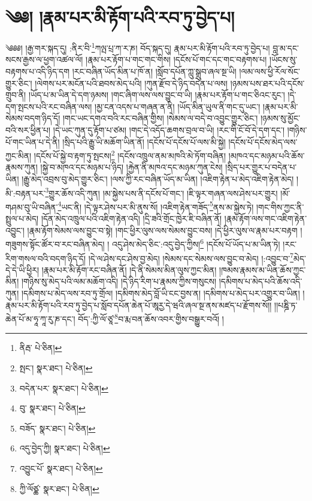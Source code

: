 \setcounter{footnote}{0} 
\chapter{༄༅། །རྣམ་པར་མི་རྟོག་པའི་རབ་ཏུ་བྱེད་པ།}༄༅༅། །རྒྱ་གར་སྐད་དུ། :ནིར་བི་\footnote{ནིརྦ་  པེ་ཅིན། }ཀལྤ་པྲ་ཀ་ར་ཎ། བོད་སྐད་དུ། རྣམ་པར་མི་རྟོག་པའི་རབ་ཏུ་བྱེད་པ། བླ་མ་དང་སངས་རྒྱས་ལ་ཕྱག་འཚལ་ལོ། །རྣམ་པར་རྟོག་པ་གང་གང་གིས། །དངོས་པོ་གང་དང་གང་བརྟགས་པ། །ཡོངས་སུ་བརྟགས་པ་འདི་ཉིད་དག །རང་བཞིན་ཡོད་མིན་པ་ཁོ་ན། །སློབ་དཔོན་ཀླུ་སྒྲུབ་ཞལ་སྔ་ཡི། །ལམ་ལས་ཕྱི་རོལ་སོང་གྱུར་ཅིང་། །ལེགས་པར་མངོན་པའི་ཐབས་མེད་པའི། །ཀུན་རྫོབ་དེ་ཉིད་བདེན་པ་ལས། །ཉམས་པས་ཐར་པའི་དངོས་གྲུབ་ནི། །ཡོད་པ་མ་ཡིན་དེ་དག་ཉམས། །གང་ཞིག་ལས་ལས་བྱུང་བ་ཡི། །རྣམ་པར་རྟོག་པ་གང་ཅིའང་རུང་། །དེ་དག་སྤངས་པའི་རང་བཞིན་ལས། །མྱ་ངན་འདས་པ་གཞན་ན་ནི། །ཡོད་མིན་ཡུལ་ནི་གང་དུ་ཡང་། །རྣམ་པར་མི་སེམས་བདག་ཉིད་དོ། །གང་ཡང་དགའ་བའི་རང་བཞིན་གྱིས། །སེམས་ལ་བདེ་བ་འབྱུང་གྱུར་ཅིང་། །ཉམས་སུ་མྱོང་བའི་སར་ཕྱིན་པ། །དེ་ཡང་ཀུན་དུ་རྟོག་པ་ཙམ། །གང་དེ་འདོད་ཆགས་བྲལ་བ་ཡི། །རང་གི་ངོ་བོ་དེ་དག་དང་། །གཉིས་པོ་གང་ཡིན་པ་དེ་ནི། །སྲིད་པའི་རྒྱུ་ཡི་མཆོག་ཡིན་ནོ། །དངོས་པོ་དངོས་པོ་ལས་མི་སྐྱེ། །དངོས་པོ་དངོས་མེད་ལས་ཀྱང་མིན། །དངོས་པོ་སྐྱེ་བ་རྟག་ཏུ་སྤངས།\footnote{སྤང་།  སྣར་ཐང་།  པེ་ཅིན། } །དངོས་འཁྲུལ་ནམ་མཁའི་མེ་ཏོག་བཞིན། །མཁའ་དང་མཉམ་པའི་ཆོས་རྣམས་ཀུན། །སྐྱེ་བ་མཁའ་དང་མཉམ་པ་ཉིད། །རྐྱེན་ནི་མཁའ་དང་མཉམ་ཀུན་ངེས། །སྲིད་པར་གྱུར་པ་བདེན་པ་ཡིན། །རྒྱུ་མེད་འབྲས་བུ་མེད་གྱུར་ཅིང་། །ལས་ཀྱི་རང་བཞིན་ཡོད་མ་ཡིན། །འཇིག་རྟེན་པ་མེད་འཇིག་རྟེན་མེད། །མི་:བརྟན་པར་\footnote{བདེན་པར་  སྣར་ཐང་།  པེ་ཅིན། }གྱུར་ཆོས་འདི་ཀུན། །མ་སྐྱེས་པས་ནི་དངོས་པོ་གང་། །ཇི་ལྟར་གཞན་ལས་ཤེས་པར་གྱུར། །མོ་གཤམ་བུ་ཡི་བཞིན་\footnote{བུ་  སྣར་ཐང་།  པེ་ཅིན། }ཡང་ནི། །དེ་ལྟར་ཤེས་པར་མི་ནུས་སོ། །འཇིག་རྟེན་གཟོད་\footnote{བཟོད་  སྣར་ཐང་།  པེ་ཅིན། }ནས་མ་སྐྱེས་ཏེ། །གང་གིས་ཀྱང་ནི་སྤྲུལ་པ་མེད། །དོན་མེད་འཁྲུལ་པའི་འཇིག་རྟེན་འདི། །དྲི་ཟའི་གྲོང་ཁྱེར་ཇི་བཞིན་ནོ། །རྣམ་རྟོག་ལས་གང་འཇིག་རྟེན་འབྱུང་། །རྣམ་རྟོག་སེམས་ལས་བྱུང་བ་སྟེ། །གང་ཕྱིར་ལུས་ལས་སེམས་བྱུང་བས། །དེ་ཕྱིར་ལུས་ལ་རྣམ་པར་བརྟག །གཟུགས་སྟོང་ཚོར་བ་རང་བཞིན་མེད། །
འདུ་ཤེས་མེད་ཅིང་:འདུ་བྱེད་ཀྱིས།\footnote{འདུ་བྱེད་ཀྱི།  སྣར་ཐང་།  པེ་ཅིན། } །དངོས་པོ་ཡོད་པ་མ་ཡིན་ཏེ། །རང་རིག་གསལ་བའི་བདག་ཉིད་དོ། །དེ་ལ་ཤེས་དང་ཤེས་བྱ་མེད། །སེམས་དང་སེམས་ལས་བྱུང་བ་མེད། །:འབྱུང་བ་\footnote{འབྱུང་པོ་  སྣར་ཐང་།  པེ་ཅིན། }མེད་དེ་དེ་ཡི་ཕྱིར། །རྣམ་པར་མི་རྟོག་རང་བཞིན་ནོ། །དེ་ནི་སེམས་མིན་ལུས་ཀྱང་མིན། །ཁམས་རྣམས་མ་ཡིན་ཆོས་ཀྱང་མིན། །གཉིས་སུ་མེད་པའི་ལམ་མཆོག་འདི། །དེ་ཉིད་རིག་པ་རྣམས་ཀྱིས་གསུངས། །དམིགས་པ་མེད་པའི་ཆོས་འདི་ཀུན། །དམིགས་པ་མེད་ལས་རབ་ཏུ་གྲོལ། །དམིགས་མེད་བློ་ཡི་ངང་བྱས་ན། །དམིགས་པ་མེད་པར་འགྱུར་བ་ཡིན། །རྣམ་པར་མི་རྟོག་པའི་རབ་ཏུ་བྱེད་པ་སློབ་དཔོན་ཆེན་པོ་ཨཱརྱ་དེ་ཝའི་ཞལ་སྔ་ནས་མཛད་པ་རྫོགས་སོ།། །།པཎྜི་ཏ་ཆེན་པོ་མ་ཧཱ་ཀཱ་རུ་ཎ་དང་། བོད་:ཀྱི་ལོ་ཙཱ་\footnote{ཀྱི་ལོཙྪ་  སྣར་ཐང་།  པེ་ཅིན། }བ་རྨ་བན་ཆོས་འབར་གྱིས་བསྒྱུར་བའོ། ། 
